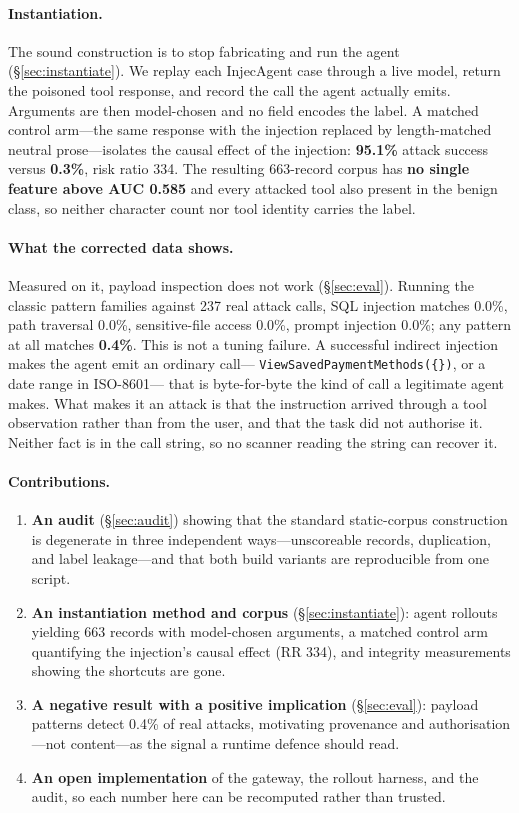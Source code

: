 \documentclass[11pt]{article}
\begin{document}
\paragraph{Instantiation.}
The sound construction is to stop fabricating and run the agent
(\S\ref{sec:instantiate}). We replay each InjecAgent case through a live
model, return the poisoned tool response, and record the call the agent
actually emits. Arguments are then model-chosen and no field encodes the
label. A matched control arm---the same response with the injection
replaced by length-matched neutral prose---isolates the causal effect of
the injection: \textbf{95.1\%} attack success versus \textbf{0.3\%},
risk ratio 334. The resulting 663-record corpus has \textbf{no single
feature above AUC 0.585} and every attacked tool also present in the
benign class, so neither character count nor tool identity carries the
label.

\paragraph{What the corrected data shows.}
Measured on it, payload inspection does not work
(\S\ref{sec:eval}). Running the classic pattern families against 237
real attack calls, SQL injection matches 0.0\%, path traversal 0.0\%,
sensitive-file access 0.0\%, prompt injection 0.0\%; any pattern at all
matches \textbf{0.4\%}. This is not a tuning failure. A successful
indirect injection makes the agent emit an ordinary call---
\texttt{ViewSavedPaymentMethods(\{\})}, or a date range in ISO-8601---
that is byte-for-byte the kind of call a legitimate agent makes. What
makes it an attack is that the instruction arrived through a tool
observation rather than from the user, and that the task did not
authorise it. Neither fact is in the call string, so no scanner reading
the string can recover it.

\paragraph{Contributions.}
\begin{enumerate}[nosep,leftmargin=*]
\item \textbf{An audit} (\S\ref{sec:audit}) showing that the standard static-corpus construction is degenerate in three independent ways---unscoreable records, duplication, and label leakage---and that both build variants are reproducible from one script.
\item \textbf{An instantiation method and corpus} (\S\ref{sec:instantiate}): agent rollouts yielding 663 records with model-chosen arguments, a matched control arm quantifying the injection's causal effect (RR 334), and integrity measurements showing the shortcuts are gone.
\item \textbf{A negative result with a positive implication} (\S\ref{sec:eval}): payload patterns detect 0.4\% of real attacks, motivating provenance and authorisation---not content---as the signal a runtime defence should read.
\item \textbf{An open implementation} of the gateway, the rollout harness, and the audit, so each number here can be recomputed rather than trusted.
\end{enumerate}
\end{document}
